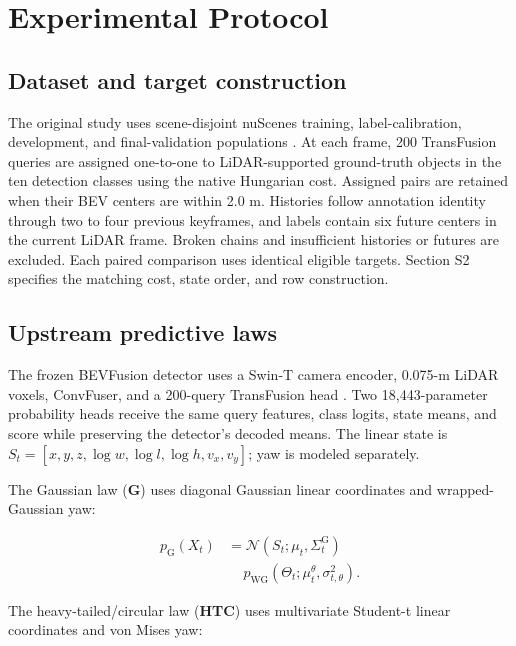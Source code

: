 \documentclass[lettersize,journal]{IEEEtran}
\begin{document}
\section{Experimental Protocol}
\label{sec:section4}

\subsection{Dataset and target construction}
\label{subsec:section4-1}

The original study uses scene-disjoint nuScenes training, label-calibration, development, and final-validation populations \cite{ref35}. At each frame, 200 TransFusion queries are assigned one-to-one to LiDAR-supported ground-truth objects in the ten detection classes using the native Hungarian cost. Assigned pairs are retained when their BEV centers are within 2.0 m. Histories follow annotation identity through two to four previous keyframes, and labels contain six future centers in the current LiDAR frame. Broken chains and insufficient histories or futures are excluded. Each paired comparison uses identical eligible targets. Section S2 specifies the matching cost, state order, and row construction.

\subsection{Upstream predictive laws}
\label{subsec:section4-2}

The frozen BEVFusion detector uses a Swin-T camera encoder, 0.075-m LiDAR voxels, ConvFuser, and a 200-query TransFusion head \cite{ref5}. Two 18,443-parameter probability heads receive the same query features, class logits, state means, and score while preserving the detector's decoded means. The linear state is \(S_t=[x,y,z,\log w,\log l,\log h,v_x,v_y]\); yaw is modeled separately.

The Gaussian law (\textbf{G}) uses diagonal Gaussian linear coordinates and wrapped-Gaussian yaw:

\begin{equation}
\label{eq:gaussian-perception-law}
\begin{aligned}
p_{\mathrm{G}}(X_t) &=\mathcal N(S_t;\mu_t,\Sigma_t^{\mathrm G}) \\[-1pt]
&\quad {}\,p_{\mathrm{WG}}(\Theta_t;\mu_t^\theta,\sigma_{t,\theta}^2).
\end{aligned}
\end{equation}

The heavy-tailed/circular law (\textbf{HTC}) uses multivariate Student-t linear coordinates and von Mises yaw:
\end{document}
